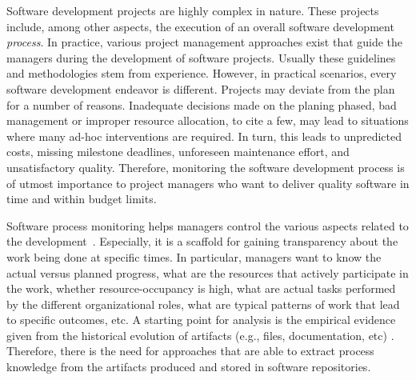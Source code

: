 
Software development projects are highly complex in nature. These projects include, among other aspects, the execution of an overall software development \emph{process}. In practice, various project management approaches exist that guide the managers during the development of software projects. Usually these guidelines and methodologies stem from experience. However, in practical scenarios, every software development endeavor is different. Projects may deviate from the plan for a number of reasons. Inadequate decisions made on the planing phased, bad management or improper resource allocation, to cite a few, may lead to situations where many ad-hoc interventions are required. In turn, this leads to unpredicted costs, missing milestone deadlines, unforeseen maintenance effort, and unsatisfactory quality. Therefore, monitoring the software development process is of utmost importance to project managers who want to deliver quality software in time and within budget limits.

Software process monitoring helps managers control the various aspects related to the development~\cite{Humphrey1995}. Especially, it is a scaffold for gaining transparency about the work being done at specific times. In particular, managers want to know the actual versus planned progress, what are the resources that actively participate in the work, whether resource-occupancy is high, what are actual tasks performed by the different organizational roles, what are typical patterns of work that lead to specific outcomes, etc. A starting point for analysis is the empirical evidence given from the historical evolution of artifacts (e.g., files, documentation, etc)
. Therefore, there is the need for approaches that are able to extract process knowledge from the artifacts produced and stored in software repositories.

